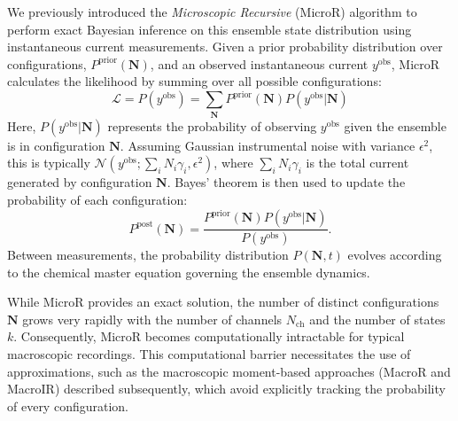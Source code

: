 \documentclass[9pt]{elife}
\begin{document}
	We previously introduced the \textit{Microscopic Recursive} (MicroR) algorithm \cite{Moffatt} to perform exact Bayesian inference on this ensemble state distribution using instantaneous current measurements. Given a prior probability distribution over configurations, \( P^{\text{prior}}(\boldsymbol{N}) \), and an observed instantaneous current \(y^{\text{obs}}\), MicroR calculates the likelihood by summing over all possible configurations:
	\begin{equation}
		\mathcal{L} = P(y^{\text{obs}}) = \sum_{\boldsymbol{N}} P^{\text{prior}}(\boldsymbol{N}) P(y^{\text{obs}} | \boldsymbol{N})
		\label{eq:microR_likelihood} %
	\end{equation}
	Here, \( P(y^{\text{obs}} | \boldsymbol{N}) \) represents the probability of observing \(y^{\text{obs}}\) given the ensemble is in configuration \( \boldsymbol{N} \). Assuming Gaussian instrumental noise with variance \(\epsilon^2\), this is typically \( \mathcal{N}(y^{\text{obs}}; \sum_i N_i \gamma_i, \epsilon^2) \), where \( \sum_i N_i \gamma_i \) is the total current generated by configuration \( \boldsymbol{N} \). Bayes' theorem is then used to update the probability of each configuration:
	\begin{equation}
		P^{\text{post}}(\boldsymbol{N}) = \frac{ P^{\text{prior}}(\boldsymbol{N}) P(y^{\text{obs}} | \boldsymbol{N})}{P(y^{\text{obs}})}.
		\label{eq:microR_posterior} %
	\end{equation}
	Between measurements, the probability distribution \( P(\boldsymbol{N}, t) \) evolves according to the chemical master equation governing the ensemble dynamics.
	
	While MicroR provides an exact solution, the number of distinct configurations \( \boldsymbol{N} \) grows very rapidly with the number of channels \( N_{\text{ch}} \) and the number of states \(k\). Consequently, MicroR becomes computationally intractable for typical macroscopic recordings. This computational barrier necessitates the use of approximations, such as the macroscopic moment-based approaches (MacroR and MacroIR) described subsequently, which avoid explicitly tracking the probability of every configuration.
	
\end{document}
